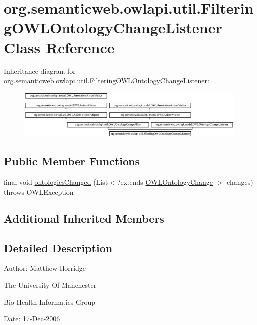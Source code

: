 \hypertarget{classorg_1_1semanticweb_1_1owlapi_1_1util_1_1_filtering_o_w_l_ontology_change_listener}{\section{org.\-semanticweb.\-owlapi.\-util.\-Filtering\-O\-W\-L\-Ontology\-Change\-Listener Class Reference}
\label{classorg_1_1semanticweb_1_1owlapi_1_1util_1_1_filtering_o_w_l_ontology_change_listener}
}
Inheritance diagram for org.\-semanticweb.\-owlapi.\-util.\-Filtering\-O\-W\-L\-Ontology\-Change\-Listener\-:\begin{figure}[H]
\begin{center}
\leavevmode
\includegraphics[height=2.374894cm]{classorg_1_1semanticweb_1_1owlapi_1_1util_1_1_filtering_o_w_l_ontology_change_listener}
\end{center}
\end{figure}
\subsection*{Public Member Functions}
\begin{DoxyCompactItemize}
\item 
final void \hyperlink{classorg_1_1semanticweb_1_1owlapi_1_1util_1_1_filtering_o_w_l_ontology_change_listener_a92143f67ceeefe3002bb758d628ea2cc}{ontologies\-Changed} (List$<$?extends \hyperlink{classorg_1_1semanticweb_1_1owlapi_1_1model_1_1_o_w_l_ontology_change}{O\-W\-L\-Ontology\-Change} $>$ changes)  throws O\-W\-L\-Exception 
\end{DoxyCompactItemize}
\subsection*{Additional Inherited Members}


\subsection{Detailed Description}
Author\-: Matthew Horridge\par
 The University Of Manchester\par
 Bio-\/\-Health Informatics Group\par
 Date\-: 17-\/\-Dec-\/2006\par
\par


